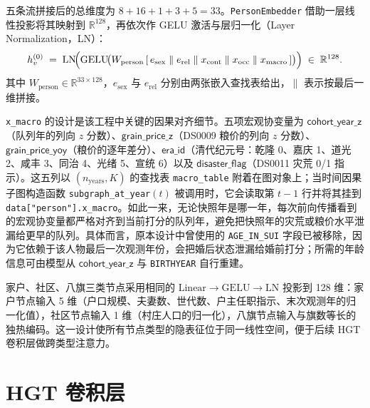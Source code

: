 五条流拼接后的总维度为 \(8+16+1+3+5=33\)。\texttt{PersonEmbedder} 借助一层线性投影将其映射到 \(\mathbb{R}^{128}\)，再依次作 GELU 激活与层归一化（Layer Normalization，LN）：
\begin{equation}\label{eq:embedder}
  h^{(0)}_v \;=\; \mathrm{LN}\!\Bigl(\mathrm{GELU}\!\bigl(W_{\text{person}}\,
    [\,e_{\text{sex}}\;\|\;e_{\text{rel}}\;\|\;x_{\text{cont}}\;\|\;x_{\text{occ}}\;\|\;x_{\text{macro}}\,]\bigr)\Bigr)
  \;\in\; \mathbb{R}^{128}.
\end{equation}
其中 \(W_{\text{person}}\in\mathbb{R}^{33\times 128}\)，\(e_{\text{sex}}\) 与 \(e_{\text{rel}}\) 分别由两张嵌入查找表给出，\(\|\) 表示按最后一维拼接。

\texttt{x\_macro} 的设计是该工程中关键的因果对齐细节。五项宏观协变量为 \(\textsf{cohort\_year\_z}\)（队列年的列向 \(z\) 分数）、\(\textsf{grain\_price\_z}\)（DS0009 粮价的列向 \(z\) 分数）、\(\textsf{grain\_price\_yoy}\)（粮价的逐年差分）、\(\textsf{era\_id}\)（清代纪元号：乾隆 0、嘉庆 1、道光 2、咸丰 3、同治 4、光绪 5、宣统 6）以及 \(\textsf{disaster\_flag}\)（DS0011 灾荒 0/1 指示）\citep{campbell2011data}。这五列以 \((n_{\text{years}}, K)\) 的查找表 \texttt{macro\_table} 附着在图对象上；当时间因果子图构造函数 \texttt{subgraph\_at\_year}\((t)\) 被调用时，它会读取第 \(t-1\) 行并将其挂到 \texttt{data["person"].x\_macro}。如此一来，无论快照年是哪一年，每次前向传播看到的宏观协变量都严格对齐到当前打分的队列年，避免把快照年的灾荒或粮价水平泄漏给更早的队列。具体而言，原本设计中曾使用的 \texttt{AGE\_IN\_SUI} 字段已被移除，因为它依赖于该人物最后一次观测年份，会把婚后状态泄漏给婚前打分；所需的年龄信息可由模型从 \(\textsf{cohort\_year\_z}\) 与 \texttt{BIRTHYEAR} 自行重建。

家户、社区、八旗三类节点采用相同的 \(\mathrm{Linear}\to\mathrm{GELU}\to\mathrm{LN}\) 投影到 128 维：家户节点输入 5 维（户口规模、夫妻数、世代数、户主任职指示、末次观测年的归一化值），社区节点输入 1 维（村庄人口的归一化），八旗节点输入与旗数等长的独热编码。这一设计使所有节点类型的隐表征位于同一线性空间，便于后续 HGT 卷积层做跨类型注意力。

\section{HGT 卷积层}\label{sec:hgt-encoder}

